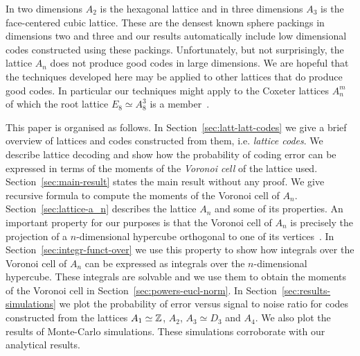 \documentclass[draftcls, onecolumn, 11pt]{IEEEtran}
\begin{document}
In two dimensions $A_2$ is the hexagonal lattice and in three dimensions $A_3$ is the face-centered cubic lattice.  These are the densest known sphere packings in dimensions two and three and our results automatically include low dimensional codes constructed using these packings.  Unfortunately, but not surprisingly, the lattice $A_n$ does not produce good codes in large dimensions.  We are hopeful that the techniques developed here may be applied to other lattices that do produce good codes.  In particular our techniques might apply to the Coxeter lattices $A_n^m$ of which the root lattice $E_8 \simeq A_8^3$ is a member~\cite{Coxeter1951,Martinet2003,McKilliam2009CoxeterLattices}.

This paper is organised as follows.  In Section~\ref{sec:latt-latt-codes} we give a brief overview of lattices and codes constructed from them, i.e. \emph{lattice codes}.  We describe lattice decoding and show how the probability of coding error can be expressed in terms of the moments of the \emph{Voronoi cell} of the lattice used.  Section~\ref{sec:main-result} states the main result without any proof.  We give recursive formula to compute the moments of the Voronoi cell of $A_n$.  Section~\ref{sec:lattice-a_n} describes the lattice $A_n$ and some of its properties.  An important property for our purposes is that the Voronoi cell of $A_n$ is precisely the projection of a $n$-dimensional hypercube orthogonal to one of its vertices~\cite{McKilliam2009CoxeterLattices,McKilliam2010thesis}.  %
In Section~\ref{sec:integr-funct-over} we use this property to show how integrals over the Voronoi cell of $A_n$ can be expressed as integrals over the $n$-dimensional hypercube. These integrals are solvable and we use them to obtain the moments of the Voronoi cell in Section~\ref{sec:powers-eucl-norm}.  In  Section~\ref{sec:results-simulations} we plot the probability of error versus signal to noise ratio for codes constructed from the lattices $A_1 \simeq {\mathbb Z}$, $A_2$, $A_3 \simeq D_3$ and $A_4$.  We also plot the results of Monte-Carlo simulations.  These simulations corroborate with our analytical results.  %
\end{document}
